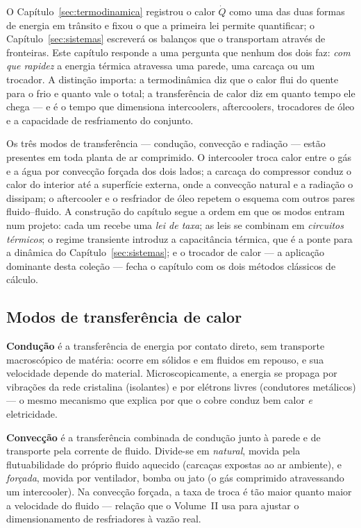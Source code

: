 \documentclass[12pt,a4paper]{article}
\numberwithin{equation}{section}
\numberwithin{table}{section}
\numberwithin{figure}{section}
\begin{document}
O Capítulo~\ref{sec:termodinamica} registrou o calor $\dot{Q}$ como uma das
duas formas de energia em trânsito e fixou o que a primeira lei permite
quantificar; o Capítulo~\ref{sec:sistemas} escreverá os balanços que o
transportam através de fronteiras. Este capítulo responde a uma pergunta que
nenhum dos dois faz: \emph{com que rapidez} a energia térmica atravessa uma
parede, uma carcaça ou um trocador. A distinção importa: a termodinâmica diz
que o calor flui do quente para o frio e quanto vale o total; a transferência
de calor diz em quanto tempo ele chega --- e é o tempo que dimensiona
intercoolers, aftercoolers, trocadores de óleo e a capacidade de resfriamento
do conjunto.

Os três modos de transferência --- condução, convecção e radiação --- estão
presentes em toda planta de ar comprimido. O intercooler troca calor entre o
gás e a água por convecção forçada dos dois lados; a carcaça do compressor
conduz o calor do interior até a superfície externa, onde a convecção natural
e a radiação o dissipam; o aftercooler e o resfriador de óleo repetem o
esquema com outros pares fluido--fluido. A construção do capítulo segue a
ordem em que os modos entram num projeto: cada um recebe uma \emph{lei de
taxa}; as leis se combinam em \emph{circuitos térmicos}; o regime transiente
introduz a capacitância térmica, que é a ponte para a dinâmica do
Capítulo~\ref{sec:sistemas}; e o trocador de calor --- a aplicação dominante
desta coleção --- fecha o capítulo com os dois métodos clássicos de cálculo.

\subsection{Modos de transferência de calor}\label{sub:v1-c5-modos}

\textbf{Condução} é a transferência de energia por contato direto, sem
transporte macroscópico de matéria: ocorre em sólidos e em fluidos em
repouso, e sua velocidade depende do material. Microscopicamente, a energia
se propaga por vibrações da rede cristalina (isolantes) e por elétrons livres
(condutores metálicos) --- o mesmo mecanismo que explica por que o cobre
conduz bem calor \emph{e} eletricidade.

\textbf{Convecção} é a transferência combinada de condução junto à parede e
de transporte pela corrente de fluido. Divide-se em \emph{natural}, movida
pela flutuabilidade do próprio fluido aquecido (carcaças expostas ao ar
ambiente), e \emph{forçada}, movida por ventilador, bomba ou jato (o gás
comprimido atravessando um intercooler). Na convecção forçada, a taxa de
troca é tão maior quanto maior a velocidade do fluido --- relação que o
Volume~II usa para ajustar o dimensionamento de resfriadores à vazão real.
\end{document}
